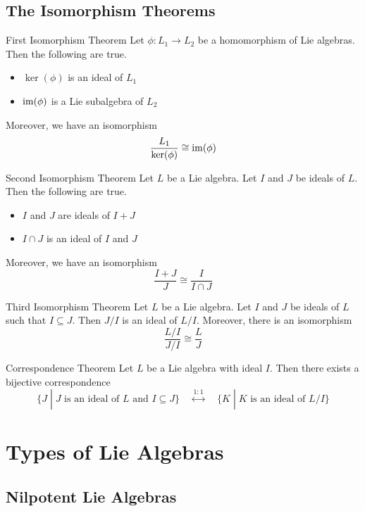 \documentclass[a4paper]{article}
\begin{document}
\subsection{The Isomorphism Theorems}
\begin{thm}{First Isomorphism Theorem}{} Let $\phi:L_1\to L_2$ be a homomorphism of Lie algebras. Then the following are true. 
\begin{itemize}
\item $\ker(\phi)$ is an ideal of $L_1$
\item $\operatorname{im}(\phi)$ is a Lie subalgebra of $L_2$
\end{itemize}
Moreover, we have an isomorphism $$\frac{L_1}{\ker(\phi)}\cong\operatorname{im}(\phi)$$
\end{thm}

\begin{thm}{Second Isomorphism Theorem}{} Let $L$ be a Lie algebra. Let $I$ and $J$ be ideals of $L$. Then the following are true. 
\begin{itemize}
\item $I$ and $J$ are ideals of $I+J$
\item $I\cap J$ is an ideal of $I$ and $J$
\end{itemize}
Moreover, we have an isomorphism $$\frac{I+J}{J}\cong\frac{I}{I\cap J}$$
\end{thm}

\begin{thm}{Third Isomorphism Theorem}{} Let $L$ be a Lie algebra. Let $I$ and $J$ be ideals of $L$ such that $I\subseteq J$. Then $J/I$ is an ideal of $L/I$. Moreover, there is an isomorphism $$\frac{L/I}{J/I}\cong\frac{L}{J}$$
\end{thm}

\begin{thm}{Correspondence Theorem}{} Let $L$ be a Lie algebra with ideal $I$. Then there exists a bijective correspondence $$\{J\;|\;J\text{ is an ideal of }L\text{ and }I\subseteq J\}\;\;\;\;\overset{1:1}{\longleftrightarrow}\;\;\;\;\{K\;|\;K\text{ is an ideal of }L/I\}$$
\end{thm}

\pagebreak
\section{Types of Lie Algebras}
\subsection{Nilpotent Lie Algebras}
\end{document}
